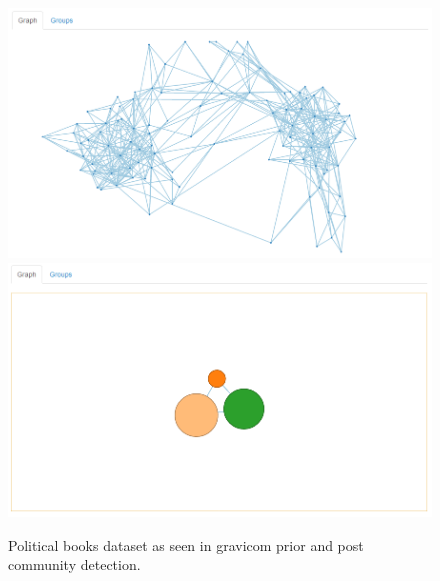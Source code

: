 \documentclass{article}\usepackage[]{graphicx}\usepackage[]{color}
\begin{document}
\begin{figure}[H]
\centering
\includegraphics[width=\textwidth]{images/polbooks_1.png}
\includegraphics[width=\textwidth]{images/polbooks_2.png}
\caption{\label{polbooks_1} Political books dataset as seen in gravicom prior and post community detection.}
\end{figure}
\end{document}
